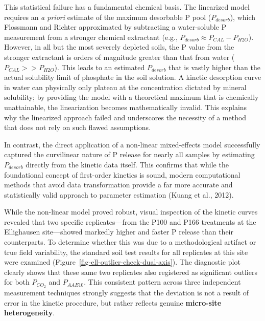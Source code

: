 \documentclass[
  a4paper,
]{article}
\begin{document}
This statistical failure has a fundamental chemical basis. The
linearized model requires an \emph{a priori} estimate of the maximum
desorbable P pool (\(P_{desorb}\)), which Flossmann and Richter
approximated by subtracting a water-soluble P measurement from a
stronger chemical extractant (e.g.,
\(P_{desorb} \approx P_{CAL} - P_{H2O}\)). However, in all but the most
severely depleted soils, the P value from the stronger extractant is
orders of magnitude greater than that from water
(\(P_{CAL} >> P_{H2O}\)). This leads to an estimated \(P_{desorb}\) that
is vastly higher than the actual solubility limit of phosphate in the
soil solution. A kinetic desorption curve in water can physically only
plateau at the concentration dictated by mineral solubility; by
providing the model with a theoretical maximum that is chemically
unattainable, the linearization becomes mathematically invalid. This
explains why the linearized approach failed and underscores the
necessity of a method that does not rely on such flawed assumptions.

In contrast, the direct application of a non-linear mixed-effects model
successfully captured the curvilinear nature of P release for nearly all
samples by estimating \(P_{desorb}\) directly from the kinetic data
itself. This confirms that while the foundational concept of first-order
kinetics is sound, modern computational methods that avoid data
transformation provide a far more accurate and statistically valid
approach to parameter estimation (Kuang et al., 2012).

While the non-linear model proved robust, visual inspection of the
kinetic curves revealed that two specific replicates---from the P100 and
P166 treatments at the Ellighausen site---showed markedly higher and
faster P release than their counterparts. To determine whether this was
due to a methodological artifact or true field variability, the standard
soil test results for all replicates at this site were examined
(Figure~\ref{fig-ell-outlier-check-dual-axis}). The diagnostic plot
clearly shows that these same two replicates also registered as
significant outliers for both \(P_{CO_2}\) and \(P_{AAE10}\). This
consistent pattern across three independent measurement techniques
strongly suggests that the deviation is not a result of error in the
kinetic procedure, but rather reflects genuine \textbf{micro-site
heterogeneity}.
\end{document}
